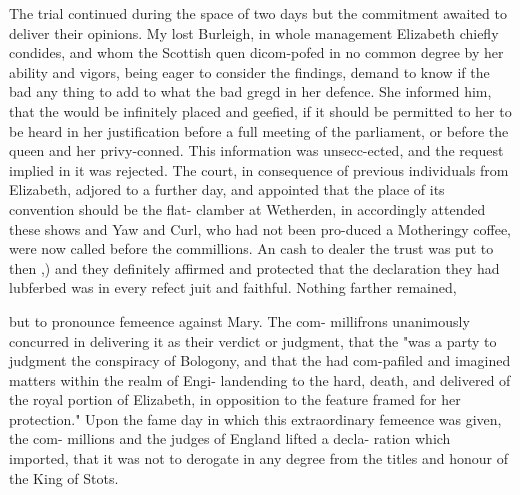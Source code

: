 The trial continued during the space of two days but the commitment awaited to deliver their opinions. My lost Burleigh, in whole management Elizabeth chiefly condides, and whom the Scottish quen dicom-pofed in no common degree by her ability and vigors, being eager to consider the findings, demand to know if the bad any thing to add to what the bad gregd in her defence. She informed him, that the would be infinitely placed and geefied, if it should be permitted to her to be heard in her justification before a full meeting of the parliament, or before the queen and her privy-conned. This information was unsecc-ected, and the request implied in it was rejected. The court, in consequence of previous individuals from Elizabeth, adjored to a further day, and appointed that the place of its convention should be the flat- clamber at Wetherden, in accordingly attended these shows and Yaw and Curl, who had not been pro-duced a Motheringy coffee, were now called before the commillions. An cash to dealer the trust was put to then ,) and they definitely affirmed and protected that the declaration they had lubferbed was in every refect juit and faithful. Nothing farther remained,\par\medskip
but to pronounce femeence against Mary. The com- millifrons unanimously concurred in delivering it as their verdict or judgment, that the "was a party to judgment the conspiracy of Bologony, and that the had com-pafiled and imagined matters within the realm of Engi- landending to the hard, death, and delivered of the royal portion of Elizabeth, in opposition to the feature framed for her protection." Upon the fame day in which this extraordinary femeence was given, the com- millions and the judges of England lifted a decla- ration which imported, that it was not to derogate in any degree from the titles and honour of the King of Stots.\par\medskip
